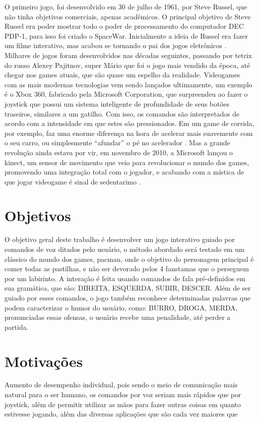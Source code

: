     O primeiro jogo, foi desenvolvido em 30 de julho de 1961, por Steve Russel, que não tinha objetivos comerciais, apenas acadêmicos. O principal objetivo de Steve Russel era poder mostrar todo o poder de processamento do computador DEC PDP-1, para isso foi criado o SpaceWar. Inicialmente a ideia de Russel era fazer um filme interativo, mas acabou se tornando o pai dos jogos eletrônicos \cite{HistJogosHenrique}. Milhares de jogos foram desenvolvidos nas décadas seguintes, passando por tetrix do russo Alexey Pajitnov, super Mário que foi o jogo mais vendido da época, até chegar nos games atuais, que são quase um espelho da realidade. Videogames com as mais modernas tecnologias vem sendo lançados ultimamente, um exemplo é o Xbox 360, fabricado pela Microsoft Corporation, que surpreendeu ao fazer o joystick que possui um sistema inteligente de profundidade de seus botões traseiros, similares a um gatilho. Com isso, os comandos são interpretados de acordo com a intensidade em que estes são pressionados. Em um game de corrida, por exemplo, faz uma enorme diferença na hora de acelerar mais suavemente com o seu carro, ou simplesmente “afundar” o pé no acelerador \cite{XBoxTechT}. Mas a grande revolução ainda estava por vir, em novembro de 2010, a Microsoft lançou o kinect, um sensor de movimento que veio para revolucionar o mundo dos games, promovendo uma integração total com o jogador, e acabando com a mística de que jogar videogame é sinal de sedentarimo \cite{KinectTechT}.

\section{Objetivos}
O objetivo geral deste trabalho é desenvolver um jogo interativo guiado por comandos de voz ditados pelo usuário, o método abordado será testado em um clássico do mundo dos games, pacman, onde o objetivo do personagem principal é comer todas as pastilhas, e não ser devorado pelos 4 fanstamas que o perseguem por um labirinto. A interação é feita usando comandos de fala pré-definidos em sua gramática, que são: DIREITA, ESQUERDA, SUBIR, DESCER. Além de ser guiado por esses comandos, o jogo também reconhece determinadas palavras que podem caracterizar o humor do usuário, como: BURRO, DROGA, MERDA, pronunciadas essas ofensas, o usuário recebe uma penalidade, até perder a partida. 

\section{Motivações}
Aumento de desempenho individual, pois sendo o meio de comunicação mais natural para o ser humano, os comandos por voz seriam mais rápidos que por joystick, além de permitir utilizar as mãos para fazer outras coisas em quanto estivesse jogando, além das diversas aplicações que são cada vez maiores que 

